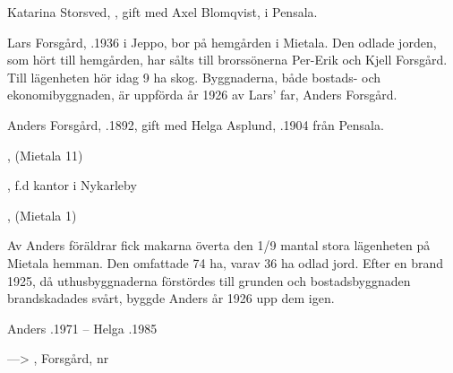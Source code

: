 Katarina Storsved, , gift med Axel Blomqvist,  i Pensala.
\begin{jhchildren}
  \item {}
  \item {}
  \item {}
  \item {}
\end{jhchildren}




Lars Forsgård, .1936 i Jeppo, bor på hemgården i Mietala. Den odlade jorden, som hört till hemgården, har sålts till brorssönerna Per-Erik och Kjell Forsgård. Till lägenheten hör idag 9 ha skog. Byggnaderna, både bostads- och ekonomibyggnaden, är uppförda år 1926 av Lars' far, Anders Forsgård.

Anders Forsgård, .1892, gift med Helga Asplund, .1904 från Pensala.
\begin{jhchildren}
  \item {}, (Mietala 11)
  \item {}, f.d kantor i Nykarleby
  \item {}, (Mietala  1)
  \item {}
  \item {}
\end{jhchildren}

Av Anders föräldrar fick makarna överta den 1/9 mantal stora lägenheten på Mietala hemman. Den omfattade 74 ha, varav 36 ha odlad jord. Efter en brand 1925, då uthusbyggnaderna förstördes till grunden och  bostadsbyggnaden  brandskadades svårt, byggde Anders år 1926 upp dem igen.

Anders .1971  --  Helga .1985




---> , Forsgård,  nr 

